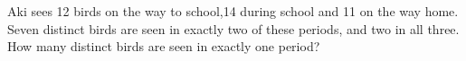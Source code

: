 Aki sees 12 birds on the way to school,14 during school and 11 on the way home. Seven distinct birds are seen in exactly two of these periods, and two in all three. How many distinct birds are seen in exactly one period?
